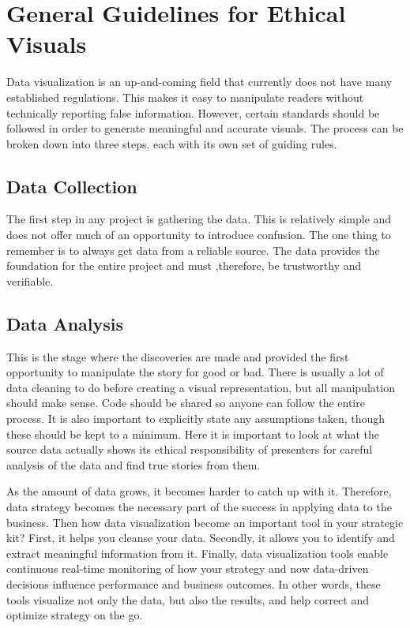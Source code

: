 \documentclass[]{book}
\theoremstyle{definition}
\theoremstyle{definition}
\theoremstyle{definition}
\theoremstyle{remark}
\begin{document}
\section{General Guidelines for Ethical
Visuals}\label{general-guidelines-for-ethical-visuals}

\citep{ethics_code}

Data visualization is an up-and-coming field that currently does not
have many established regulations. This makes it easy to manipulate
readers without technically reporting false information. However,
certain standards should be followed in order to generate meaningful and
accurate visuals. The process can be broken down into three steps, each
with its own set of guiding rules.

\subsection{Data Collection}\label{data-collection}

The first step in any project is gathering the data. This is relatively
simple and does not offer much of an opportunity to introduce confusion.
The one thing to remember is to always get data from a reliable source.
The data provides the foundation for the entire project and must
,therefore, be trustworthy and verifiable.

\subsection{Data Analysis}\label{data-analysis}

This is the stage where the discoveries are made and provided the first
opportunity to manipulate the story for good or bad. There is usually a
lot of data cleaning to do before creating a visual representation, but
all manipulation should make sense. Code should be shared so anyone can
follow the entire process. It is also important to explicitly state any
assumptions taken, though these should be kept to a minimum. Here it is
important to look at what the source data actually shows its ethical
responsibility of presenters for careful analysis of the data and find
true stories from them.

As the amount of data grows, it becomes harder to catch up with it.
Therefore, data strategy becomes the necessary part of the success in
applying data to the business. Then how data visualization become an
important tool in your strategic kit? First, it helps you cleanse your
data. Secondly, it allows you to identify and extract meaningful
information from it. Finally, data visualization tools enable continuous
real-time monitoring of how your strategy and now data-driven decisions
influence performance and business outcomes. In other words, these tools
visualize not only the data, but also the results, and help correct and
optimize strategy on the go.
\end{document}
